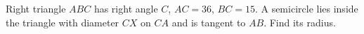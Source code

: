 Right triangle $ABC$ has right angle $C$, $AC=36$, $BC=15$. A semicircle lies inside the triangle with diameter $CX$ on $CA$ and is tangent to $AB$. Find its radius.
